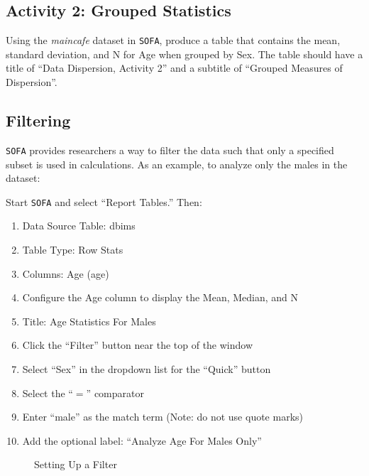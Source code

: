\subsection{Activity 2: Grouped Statistics} \label{dis:act02}

Using the \textit{maincafe} dataset in \texttt{SOFA}, produce a table that contains the mean, standard deviation, and N for Age when grouped by Sex. The table should have a title of ``Data Dispersion, Activity 2'' and a subtitle of ``Grouped Measures of Dispersion''.

\subsection{Filtering}

\texttt{SOFA} provides researchers a way to filter the data such that only a specified subset is used in calculations. As an example, to analyze only the males in the dataset:

Start \texttt{SOFA} and select ``Report Tables.'' Then:

\begin{enumerate}
  \item Data Source Table: dbims
  \item Table Type: Row Stats
  \item Columns: Age (age)
  \item Configure the Age column to display the Mean, Median, and N
  \item Title: Age Statistics For Males
  \item Click the ``Filter'' button near the top of the window
  \item Select ``Sex'' in the dropdown list for the ``Quick'' button
  \item Select the ``$ = $'' comparator
  \item Enter ``male'' as the match term (Note: do not use quote marks)
  \item Add the optional label: ``Analyze Age For Males Only''
\end{enumerate}
  
\begin{figure}[H]
  \begin{center}
    \caption{Setting Up a Filter}
  \end{center}
\end{figure}

